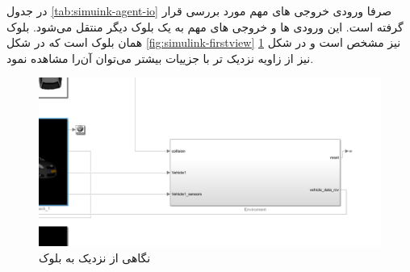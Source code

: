 در جدول \ref{tab:simuink-agent-io} صرفا ورودی خروجی های مهم مورد بررسی قرار گرفته است. این ورودی ها و خروجی های مهم به یک بلوک دیگر منتقل می‌شود. بلوک 
همان بلوک است که در شکل
\ref{fig:simulink-firstview}
نیز مشخص است و در شکل 
\ref{fig:simulink-env}
نیز از زاویه نزدیک تر با جزییات بیشتر می‌توان آن‌را مشاهده نمود.



\begin{figure}
	\centering
	\includegraphics[width=0.7\linewidth]{Figures/simulink/simulink-Env}
	\caption{نگاهی از نزدیک به بلوک }
	\label{fig:simulink-env}
\end{figure}






%
%






